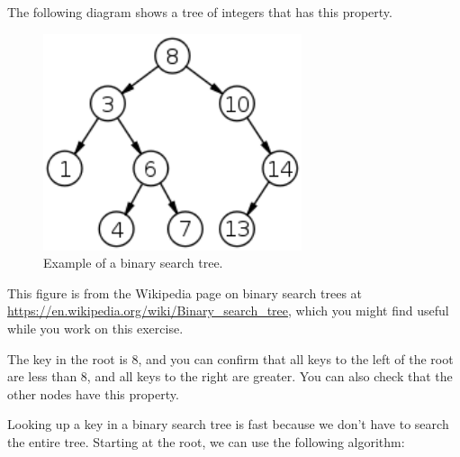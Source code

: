 \documentclass[12pt]{book}
\theoremstyle{exercise}
\newcommand{\java}{\verb}%}
\begin{document}

The following diagram shows a tree of integers that has this property.

\begin{figure}
\centering
\includegraphics[height=2.5in]{figs/200px-Binary_search_tree-svg.png}
\caption{Example of a binary search tree.}
\end{figure}

This figure is from the Wikipedia page on binary search trees at
\url{https://en.wikipedia.org/wiki/Binary_search_tree}, which you
might find useful while you work on this exercise.

The key in the root is 8, and you can confirm that all keys to the left
of the root are less than 8, and all keys to the right are greater. You
can also check that the other nodes have this property.

Looking up a key in a binary search tree is fast because we don't have
to search the entire tree. Starting at the root, we can use the
following algorithm:

\end{document}
